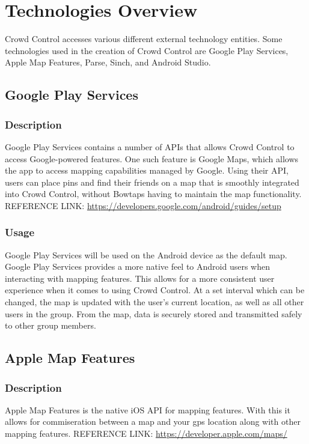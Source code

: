 \section{Technologies Overview}
Crowd Control accesses various different external technology entities. Some technologies used in the creation of Crowd Control are Google Play Services, Apple Map Features, Parse, Sinch, and Android Studio.

\subsection{Google Play Services}
	\subsubsection{Description}
	Google Play Services contains a number of APIs that allows Crowd Control to access Google-powered features. One such feature is Google Maps, which allows the app to access mapping capabilities managed by Google. Using their API, users can place pins and find their friends on a map that is smoothly integrated into Crowd Control, without Bowtaps having to maintain the map functionality.
\newline
REFERENCE LINK:  \url{https://developers.google.com/android/guides/setup}
	\subsubsection{Usage}
	Google Play Services will be used on the Android device as the default map. Google Play Services provides a more native feel to Android users when interacting with mapping features. This allows for a more consistent user experience when it comes to using Crowd Control. At a set interval which can be changed, the map is updated with the user's current location, as well as all other users in the group. From the map, data is securely stored and transmitted safely to other group members.

\subsection{Apple Map Features}
	\subsubsection{Description}
	Apple Map Features is the native iOS API for mapping features. With this it allows for commiseration between a map and your gps location along with other mapping features.
\newline
REFERENCE LINK: \url{https://developer.apple.com/maps/}
